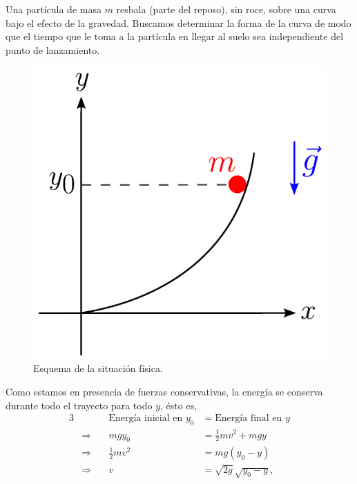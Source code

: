 \begin{ejemplo}
    Una partícula de masa $m$ resbala (parte del reposo), sin roce, sobre una curva bajo el efecto de la gravedad. Buscamos determinar la forma de la curva de modo que el tiempo que le toma a la partícula en llegar al suelo sea independiente del punto de lanzamiento. 

    \begin{figure}[H]
        \centering
        \includegraphics[scale = 0.65]{Figuras/tautocrona.pdf}
        \caption{Esquema de la situación física.}
        \label{fig:tautocrona}
    \end{figure}

    Como estamos en presencia de fuerzas conservativas, la  energía se conserva durante todo el trayecto para todo $y$, ésto es,
    \begin{alignat*}{3}
    &               &\quad   \text{Energía inicial en $y_0$} &= \text{Energía final en $y$} \\
    &  \Rightarrow  &\quad      mgy_0 &= \frac{1}{2} mv^2 + mgy \\
    &  \Rightarrow  &\quad   \frac{1}{2} mv^2 &= mg(y_0 - y) \\
    &  \Rightarrow  &\quad   v &= \sqrt{2 g} \sqrt{y_0-y}, 
    \end{alignat*}   
    

\end{ejemplo}
